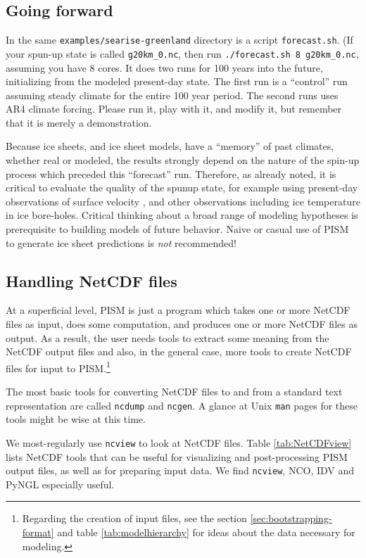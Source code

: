 \subsection{Going forward}  \label{subsect:forecastcaution}  In the same \verb|examples/searise-greenland| directory is a script \verb|forecast.sh|.  (If your spun-up state is called \texttt{g20km_0.nc}, then run  \verb|./forecast.sh 8 g20km_0.nc|, assuming you have 8 cores.  It does two runs for 100 years into the future, initializing from the modeled present-day state. The first run is a ``control''  run assuming steady climate for the entire 100 year period. The second runs uses AR4 climate forcing. Please run it, play with it, and modify it, but remember that it is merely a demonstration.

Because ice sheets, and ice sheet models, have a ``memory'' of past climates, whether real or modeled, the results strongly depend on the nature of the spin-up process which preceded this ``forecast'' run.  Therefore, as already noted, it is critical to evaluate the quality of the spunup state, for example using present-day observations of surface velocity \cite{BKAJS}, and other observations including ice temperature in ice bore-holes.  Critical thinking about a broad range of modeling hypotheses is prerequisite to building models of future behavior.  Naive or casual use of PISM to generate ice sheet predictions is \emph{not} recommended!


\subsection{Handling NetCDF files}\label{subsect:nctoolsintro}  At a superficial level, PISM is just a program which takes one or more NetCDF files as input, does some computation, and produces one or more NetCDF files as output.  As a result, the user needs tools to extract some meaning from the NetCDF output files and also, in the general case, more tools to create NetCDF files for input to PISM.\footnote{Regarding the creation of input files, see the section \ref{sec:bootstrapping-format} and table \ref{tab:modelhierarchy} for ideas about the data necessary for modeling.}

The most basic tools for converting NetCDF files to and from a standard text representation are called \texttt{ncdump} and \texttt{ncgen}.  A glance at Unix \texttt{man} pages for these tools might be wise at this time.

We most-regularly use \texttt{ncview} to look at NetCDF files.  Table \ref{tab:NetCDFview} lists NetCDF tools that can be useful for visualizing and post-processing PISM output files, as well as for preparing input data.  We find \texttt{ncview}, NCO, IDV and PyNGL especially useful.

